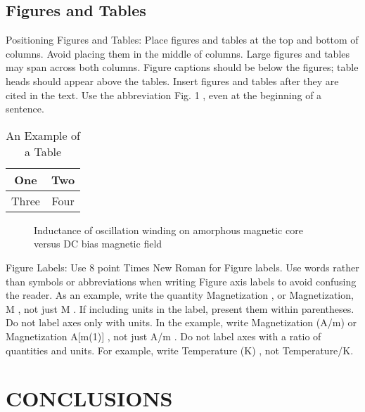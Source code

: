 \documentclass[letterpaper, 10 pt, conference]{ieeeconf}  %
\begin{document}
\subsection{Figures and Tables}

Positioning Figures and Tables: Place figures and tables at the top and bottom of columns. Avoid placing them in the middle of columns. Large figures and tables may span across both columns. Figure captions should be below the figures; table heads should appear above the tables. Insert figures and tables after they are cited in the text. Use the abbreviation  Fig. 1 , even at the beginning of a sentence.

\begin{table}[h]
\caption{An Example of a Table}
\label{table_example}
\begin{center}
\begin{tabular}{|c||c|}
\hline
One & Two\\
\hline
Three & Four\\
\hline
\end{tabular}
\end{center}
\end{table}


   \begin{figure}[thpb]
      \centering
      \caption{Inductance of oscillation winding on amorphous
       magnetic core versus DC bias magnetic field}
      \label{figurelabel}
   \end{figure}
   

Figure Labels: Use 8 point Times New Roman for Figure labels. Use words rather than symbols or abbreviations when writing Figure axis labels to avoid confusing the reader. As an example, write the quantity  Magnetization , or  Magnetization, M , not just  M . If including units in the label, present them within parentheses. Do not label axes only with units. In the example, write  Magnetization (A/m)  or  Magnetization {A[m(1)]} , not just  A/m . Do not label axes with a ratio of quantities and units. For example, write  Temperature (K) , not  Temperature/K. 

\section{CONCLUSIONS}
\end{document}
